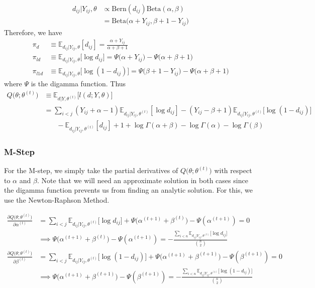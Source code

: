 \documentclass{article}
\begin{document}
\begin{align*}
d_{ij} | Y_{ij}, \theta &\propto \text{Bern}(d_{ij})\text{Beta}(\alpha, \beta)\\
&= \text{Beta}\Big(\alpha + Y_{ij}, \beta + 1 - Y_{ij}\Big)
\end{align*}
Therefore, we have
\begin{align*}
\pi_d &\equiv \mathbb{E}_{d_{ij} | Y_{ij}, \theta} [d_{ij}] = \frac{\alpha + Y_{ij}}{\alpha + \beta + 1} \\
\pi_{ld} &\equiv \mathbb{E}_{d_{ij} | Y_{ij}, \theta} \big[\log d_{ij}\big] = \Psi\Big(\alpha + Y_{ij}\Big) - \Psi\Big(\alpha + \beta + 1\Big) \\
\pi_{l1d} &\equiv \mathbb{E}_{d_{ij} | Y_{ij}, \theta} \big[\log (1 - d_{ij})\big] = \Psi\Big(\beta + 1 - Y_{ij}\Big) - \Psi\Big(\alpha + \beta + 1\Big)
\end{align*}
where $\Psi$ is the digamma function. Thus
\begin{align*}
Q\big(\theta; \theta^{(t)}\big) &\equiv \mathbb{E}_{d | Y, \theta^{(t)}} \Big[l(d; Y, \theta)\Big] \\
&= \sum_{i<j} (Y_{ij} + \alpha - 1) \mathbb{E}_{d_{ij} | Y_{ij}, \theta^{(t)}} [\log  d_{ij}] - (Y_{ij} - \beta + 1) \mathbb{E}_{d_{ij} | Y_{ij}, \theta^{(t)}} \big[\log (1-d_{ij})\big] \\
&\ \ \ \ \ \ \ \ - \mathbb{E}_{d_{ij} | Y_{ij}, \theta^{(t)}} [d_{ij}] + 1 + \log \Gamma(\alpha + \beta) - \log \Gamma(\alpha) - \log \Gamma(\beta) \tag{E}
\end{align*}

\subsubsection{M-Step}

For the M-step, we simply take the partial derivatives of $Q\big(\theta; \theta^{(t)}\big)$ with respect to $\alpha$ and $\beta$. Note that we will need an approximate solution in both cases since the digamma function prevents us from finding an analytic solution. For this, we use the Newton-Raphson Method.

\begin{align*}
\frac{\partial Q\big(\theta; \theta^{(t)}\big)}{\partial \alpha^{(t)}} &= \sum_{i<j} \mathbb{E}_{d_{ij} | Y_{ij}, \theta^{(t)}} \big[\log d_{ij}\big] + \Psi\Big(\alpha^{(t+1)} + \beta^{(t)}\Big) - \Psi(\alpha^{(t+1)})= 0 \\
&\implies \Psi\Big(\alpha^{(t+1)} + \beta^{(t)}\Big) - \Psi(\alpha^{(t+1)}) = -\frac{\sum_{i<n}\mathbb{E}_{d_{ij} | Y_{ij}, \theta^{(t)}} \big[\log d_{ij}\big]}{{n \choose 2}} \tag{M1} \\
\frac{\partial Q\big(\theta; \theta^{(t)}\big)}{\partial \beta^{(t)}} &= \sum_{i<j} \mathbb{E}_{d_{ij} | Y_{ij}, \theta^{(t)}} \big[\log (1- d_{ij})\big] + \Psi\Big(\alpha^{(t+1)} + \beta^{(t+1)}\Big) - \Psi(\beta^{(t+1)}) = 0 \\
&\implies \Psi\Big(\alpha^{(t+1)} + \beta^{(t+1)}\Big) - \Psi(\beta^{(t+1)}) = -\frac{\sum_{i<n}\mathbb{E}_{d_{ij} | Y_{ij}, \theta^{(t)}} \big[\log (1 - d_{ij})\big]}{{n \choose 2}} \tag{M2} \\
\end{align*}
\end{document}

